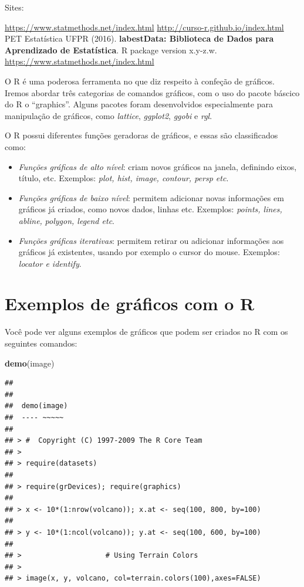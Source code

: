 \documentclass[
]{book}
\newenvironment{Shaded}{\begin{snugshade}}{\end{snugshade}}
\newcommand{\KeywordTok}[1]{\textcolor[rgb]{0.13,0.29,0.53}{\textbf{#1}}}
\newcommand{\NormalTok}[1]{#1}
\begin{document}
Sites:

\url{https://www.statmethods.net/index.html}
\url{http://curso-r.github.io/index.html} PET Estatística UFPR (2016). \textbf{labestData: Biblioteca de Dados para Aprendizado de Estatística}. R package version x.y-z.w.
\url{https://www.statmethods.net/index.html}

O R é uma poderosa ferramenta no que diz respeito à confeção de gráficos. Iremos abordar três categorias de comandos gráficos, com o uso do pacote báscico do R o ``graphics''. Alguns pacotes foram desenvolvidos especialmente para manipulação de gráficos, como \emph{lattice}, \emph{ggplot2}, \emph{ggobi} e \emph{rgl}.

O R possui diferentes funções geradoras de gráficos, e essas são classificados como:

\begin{itemize}
\item
  \emph{Funções gráficas de alto nível}: criam novos gráficos na janela, definindo eixos, título, etc. Exemplos: \emph{plot, hist, image, contour, persp etc}.
\item
  \emph{Funções gráficas de baixo nível}: permitem adicionar novas informações em gráficos já criados, como novos dados, linhas etc. Exemplos: \emph{points, lines, abline,} \emph{polygon, legend etc}.
\item
  \emph{Funções gráficas iterativas}: permitem retirar ou adicionar informações aos gráficos já existentes, usando por exemplo o cursor do mouse. Exemplos: \emph{locator e identify}.
\end{itemize}

\hypertarget{exemplos-de-gruxe1ficos-com-o-r}{%
\section{Exemplos de gráficos com o R}\label{exemplos-de-gruxe1ficos-com-o-r}}

Você pode ver alguns exemplos de gráficos que podem ser criados no R com os seguintes comandos:

\begin{Shaded}
\begin{Highlighting}[]
\KeywordTok{demo}\NormalTok{(image)}
\end{Highlighting}
\end{Shaded}

\begin{verbatim}
## 
## 
##  demo(image)
##  ---- ~~~~~
## 
## > #  Copyright (C) 1997-2009 The R Core Team
## > 
## > require(datasets)
## 
## > require(grDevices); require(graphics)
## 
## > x <- 10*(1:nrow(volcano)); x.at <- seq(100, 800, by=100)
## 
## > y <- 10*(1:ncol(volcano)); y.at <- seq(100, 600, by=100)
## 
## >                    # Using Terrain Colors
## > 
## > image(x, y, volcano, col=terrain.colors(100),axes=FALSE)
\end{verbatim}
\end{document}

